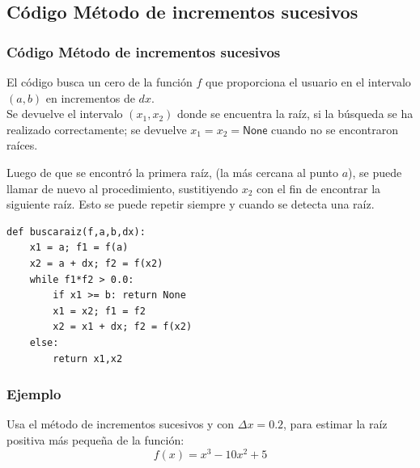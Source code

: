 \documentclass[12pt]{beamer}
\begin{document}
\subsection{C\'{o}digo M\'{e}todo de incrementos sucesivos}
\begin{frame}
\frametitle{C\'{o}digo M\'{e}todo de incrementos sucesivos}
El c\'{o}digo busca un cero de la función $f$ que proporciona el usuario en el intervalo
$(a,b)$ en incrementos de $dx$.
\\
\bigskip
Se devuelve el intervalo $(x_{1}, x_{2})$ donde se encuentra la ra\'{i}z, si la b\'{u}squeda
se ha realizado correctamente; se devuelve $x_{1} = x_{2} = \mathsf{None}$ cuando no se encontraron ra\'{i}ces.
\end{frame}
\begin{frame}
Luego de que se encontr\'{o} la primera ra\'{i}z, (la m\'{a}s cercana al punto $a$), se puede llamar de nuevo al procedimiento, sustitiyendo $x_{2}$ con el fin de encontrar la siguiente ra\'{i}z. Esto se puede repetir siempre y cuando se detecta una ra\'{i}z.
\end{frame}
\begin{frame}[fragile]
\begin{lstlisting}
def buscaraiz(f,a,b,dx):
    x1 = a; f1 = f(a)
    x2 = a + dx; f2 = f(x2)
    while f1*f2 > 0.0:
        if x1 >= b: return None
        x1 = x2; f1 = f2
        x2 = x1 + dx; f2 = f(x2)
    else:
        return x1,x2
\end{lstlisting}
\end{frame}
\begin{frame}
\frametitle{Ejemplo}
Usa el m\'{e}todo de incrementos sucesivos y con $\Delta x= 0.2$, para estimar la ra\'{i}z positiva m\'{a}s pequeña de la funci\'{o}n:
\[ f(x) = x^{3} - 10 x^{2} + 5\]
\end{frame}
\end{document}
